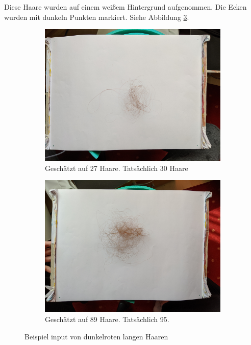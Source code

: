 \documentclass[german,a4paper, 12pt]{llncs}
\begin{document}
Diese Haare wurden auf einem weißem Hintergrund aufgenommen. Die Ecken wurden mit dunkeln Punkten markiert. Siehe Abbildung \ref{img:tstM}.

\begin{figure}
	\centering
	\begin{subfigure}[b]{0.475\textwidth}
		\centering
		\includegraphics[width=\textwidth]{figMummel/IMG_20200325_172536_30.jpg}
		\caption[]{Geschätzt auf 27 Haare. Tatsächlich 30 Haare}
		\label{img:tstM1} 
	\end{subfigure}
	\hfill
	\begin{subfigure}[b]{0.475\textwidth} 
		\centering
		\includegraphics[width=\textwidth]{figMummel/IMG_20200327_132125_95.jpg}
		\caption[]{Geschätzt auf 89 Haare. Tatsächlich 95.}
		\label{img:tstM2}
	\end{subfigure}
	\caption[  ]
	{\small Beispiel input von dunkelroten langen Haaren} 
	\label{img:tstM}
\end{figure}
\end{document}
